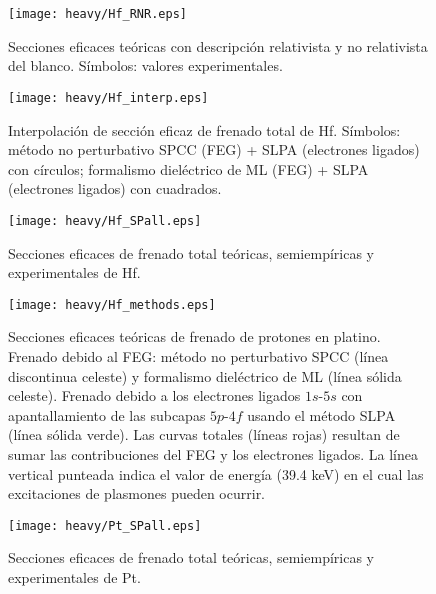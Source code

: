 \begin{figure}[H]
\centering
\texttt{[image: heavy/Hf\_RNR.eps]}
\caption[Secciones eficaces relativistas y no relativistas de Hf.]
{Secciones eficaces teóricas con descripción relativista y no relativista
del blanco. Símbolos: valores experimentales.}
\label{fig:Hf_SP}
\end{figure}

\begin{figure}[H]
\centering
\texttt{[image: heavy/Hf\_interp.eps]}
\caption[Interpolación de sección eficaz de frenado total.]
{Interpolación de sección eficaz de frenado total de Hf. Símbolos:
método no perturbativo SPCC (FEG) + SLPA (electrones ligados) con 
círculos; formalismo dieléctrico de ML (FEG) + SLPA (electrones ligados) 
con cuadrados.} 
\label{fig:Hf_interp}
\end{figure}

\begin{figure}[H]
\centering
\texttt{[image: heavy/Hf\_SPall.eps]}
\caption[Secciones eficaces teóricas, semiempíricas y experimentales de 
Hf.]{Secciones eficaces de frenado total teóricas, semiempíricas y
experimentales de Hf.}
\label{fig:Hf_SP}
\end{figure}


\begin{figure}[H]
\centering
\texttt{[image: heavy/Hf\_methods.eps]}
\caption[Secciones eficaces teóricas de frenado de protones en Pt.]
{Secciones eficaces teóricas de frenado de protones en platino.
Frenado debido al FEG: método no perturbativo SPCC (línea discontinua 
celeste) y formalismo dieléctrico de ML (línea sólida celeste). 
Frenado debido a los electrones ligados $1s$-$5s$ con apantallamiento de 
las subcapas $5p$-$4f$ usando el método SLPA (línea sólida verde).
Las curvas totales (líneas rojas) resultan de sumar las contribuciones 
del FEG y los electrones ligados. 
La línea vertical punteada indica el valor de energía (39.4 keV) en el 
cual las excitaciones de plasmones pueden ocurrir.} 
\label{fig:Pt_methods}
\end{figure}

\begin{figure}[H]
\centering
\texttt{[image: heavy/Pt\_SPall.eps]}
\caption[Secciones eficaces teóricas, semiempíricas y experimentales de 
Pt.]{Secciones eficaces de frenado total teóricas, semiempíricas y
experimentales de Pt.}
\label{fig:Pt_SP}
\end{figure}


